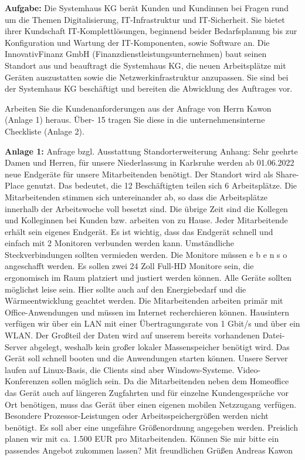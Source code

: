 \documentclass[10pt]{article}
\begin{document}
\begin{flushleft}
\textbf{Aufgabe:}
Die Systemhaus KG berät Kunden und Kundinnen bei Fragen rund um die Themen Digitalisierung, IT-Infrastruktur und IT-Sicherheit. Sie bietet ihrer Kundschaft IT-Komplettlösungen, beginnend beider Bedarfsplanung bis zur Konfiguration und Wartung der IT-Komponenten, sowie Software an.
Die InnovativFinanz GmbH (Finanzdienstleistungsunternehmen) baut seinen Standort aus und beauftragt die Systemhaus KG, die neuen Arbeitsplätze mit Geräten auszustatten sowie die Netzwerkinfrastruktur anzupassen.
Sie sind bei der Systemhaus KG beschäftigt und bereiten die Abwicklung des Auftrages vor.

Arbeiten Sie die Kundenanforderungen aus der Anfrage von Herrn Kawon (Anlage 1) heraus. Über- 15 tragen Sie diese in die unternehmensinterne Checkliste (Anlage 2).

\textbf{Anlage 1:}
Anfrage bzgl. Ausstattung Standorterweiterung Anhang:
Sehr geehrte Damen und Herren,
für unsere Niederlassung in Karlsruhe werden ab 01.06.2022 neue Endgeräte für unsere Mitarbeitenden benötigt. Der Standort wird als Share-Place genutzt. Das bedeutet, die
12 Beschäftigten teilen sich 6 Arbeitsplätze. Die Mitarbeitenden stimmen sich untereinander ab, so dass die Arbeitsplätze innerhalb der Arbeitswoche voll besetzt sind. Die übrige Zeit sind die Kollegen und Kolleginnen bei Kunden bzw. arbeiten von zu Hause. Jeder Mitarbeitende erhält sein eigenes Endgerät.
Es ist wichtig, dass das Endgerät schnell und einfach mit 2 Monitoren verbunden werden kann. Umständliche Steckverbindungen sollten vermieden werden. Die Monitore müssen
e b e n s o angeschafft werden. Es sollen zwei 24 Zoll Full-HD Monitore sein, die ergonomisch im Raum platziert und justiert werden können. Alle Geräte sollten möglichst leise sein. Hier sollte auch auf den Energiebedarf und die Wärmeentwicklung geachtet werden.
Die Mitarbeitenden arbeiten primär mit Office-Anwendungen und müssen im Internet recherchieren können. Hausintern verfügen wir über ein LAN mit einer Übertragungsrate von
1 Gbit/s und über ein WLAN. Der Großteil der Daten wird auf unserem bereits vorhandenen Datei-Server abgelegt, weshalb kein großer lokaler Massenspeicher benötigt wird. Das Gerät soll schnell booten und die Anwendungen starten können. Unsere Server laufen auf Linux-Basis, die Clients sind aber Windows-Systeme. Video-Konferenzen sollen möglich sein.
Da die Mitarbeitenden neben dem Homeoffice das Gerät auch auf längeren Zugfahrten und für einzelne Kundengespräche vor Ort benötigen, muss das Gerät über einen eigenen mobilen Netzzugang verfügen. Besondere Prozessor-Leistungen oder Arbeitsspeichergrößen werden nicht benötigt. Es soll aber eine ungefähre Größenordnung angegeben werden.
Preislich planen wir mit ca. 1.500 EUR pro Mitarbeitenden.
Können Sie mir bitte ein passendes Angebot zukommen lassen? Mit freundlichen Grüßen
Andreas Kawon


\end{flushleft}
\end{document}
